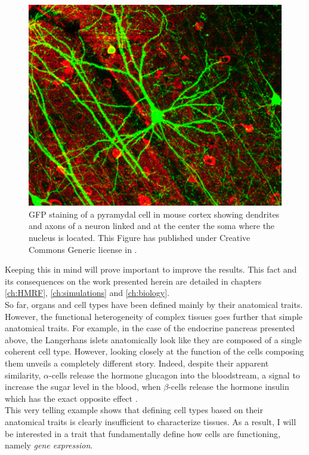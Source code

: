 \begin{figure}[bth]
\begin{center}
  \includegraphics[width=0.8\linewidth]{gfx/chapter1/neuron.png}
\end{center}
  \caption{GFP staining of a pyramydal cell in mouse cortex showing dendrites and axons of a neuron linked and at the center the soma where the nucleus is located. This Figure has published under Creative Commons Generic license in \cite{lee06}.}
  \label{fig:neuron}
\end{figure}
	
     Keeping this in mind will prove important to improve the results. This fact and its consequences on the work presented herein are detailed in chapters \ref{ch:HMRF}, \ref{ch:simulations} and \ref{ch:biology}.\\
     
     So far, organs and cell types have been defined mainly by their anatomical traits. However, the functional heterogeneity of complex tissues goes further that simple anatomical traits. For example, in the case of the endocrine pancreas presented above, the Langerhans islets anatomically look like they are composed of a single coherent cell type. However, looking closely at the function of the cells composing them unveils a completely different story. Indeed, despite their apparent similarity, $\alpha$-cells release the hormone glucagon into the bloodstream, a signal to increase the sugar level in the blood, when $\beta$-cells release the hormone insulin which has the exact opposite effect \cite{costanzo06}.\\
     
     This very telling example shows that defining cell types based on their anatomical traits is clearly insufficient to characterize tissues.  As a result, I will be interested in a trait that fundamentally define how cells are functioning, namely \emph{gene expression}. 

